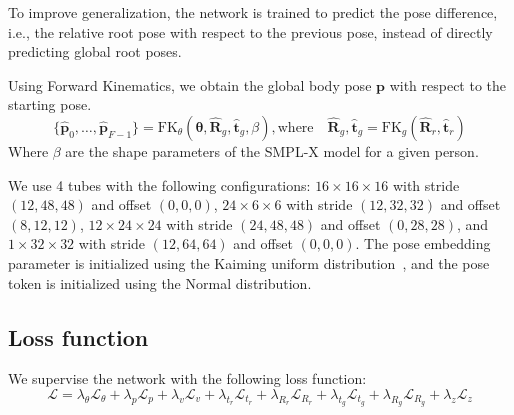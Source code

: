 To improve generalization, the network is trained to predict the pose difference, i.e., the relative root pose with respect to the previous pose, instead of directly predicting global root poses.

Using Forward Kinematics, we obtain the global body pose $\bm{p}$ with respect to the starting pose.
\begin{equation}
    \{\bm{\hat{p}}_{0}, \ldots, \bm{\hat{p}}_{F-1}\} = \mathrm{FK}_{\theta}(\bm{\theta}, \hat{\bm{R}}_{g}, \hat{\bm{t}}_{g}, \beta), \text{where}  \quad\hat{\bm{R}}_{g}, \hat{\bm{t}}_{g} = \mathrm{FK}_{g}(\hat{\bm{R}}_{r}, \hat{\bm{t}}_{r}) 
\end{equation}
Where $\beta$ are the shape parameters of the SMPL-X model \cite{SMPL-X:2019} for a given person.

We use 4 tubes with the following configurations: \(16 \times 16 \times 16\) with stride \((12, 48, 48)\) and offset \((0, 0, 0)\), \(24 \times 6 \times 6\) with stride \((12, 32, 32)\) and offset \((8, 12, 12)\), \(12 \times 24 \times 24\) with stride \((24, 48, 48)\) and offset \((0, 28, 28)\), and \(1 \times 32 \times 32\) with stride \((12, 64, 64)\) and offset \((0, 0, 0)\). The pose embedding parameter is initialized using the Kaiming uniform distribution~\cite{heDelvingDeepRectifiers2015feb}, and the pose token is initialized using the Normal distribution.

\subsection{Loss function}
We supervise the network with the following loss function:
\begin{equation}
    \mathcal{L} = \lambda_{\theta}\mathcal{L}_{\theta} +  \lambda_{p}\mathcal{L}_{p} +  \lambda_{v}\mathcal{L}_{v} +  \lambda_{t_{r}}\mathcal{L}_{t_{r}} +  \lambda_{R_{r}}\mathcal{L}_{R_{r}} +  \lambda_{t_{g}}\mathcal{L}_{t_{g}} + \lambda_{R_{g}}\mathcal{L}_{R_{g}}  + \lambda_{z}\mathcal{L}_{z}
\end{equation}

